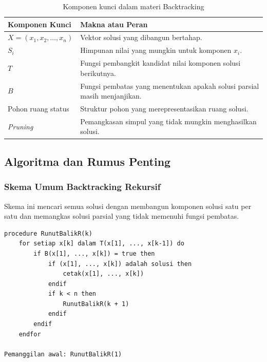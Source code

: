 \begin{table}[H]
\centering
\begin{tabularx}{\textwidth}{|L{0.28\textwidth}|X|}
\hline
\textbf{Komponen Kunci} & \textbf{Makna atau Peran} \\
\hline
$X=(x_1,x_2,\ldots,x_n)$ & Vektor solusi yang dibangun bertahap. \\
\hline
$S_i$ & Himpunan nilai yang mungkin untuk komponen $x_i$. \\
\hline
$T$ & Fungsi pembangkit kandidat nilai komponen solusi berikutnya. \\
\hline
$B$ & Fungsi pembatas yang menentukan apakah solusi parsial masih menjanjikan. \\
\hline
Pohon ruang status & Struktur pohon yang merepresentasikan ruang solusi. \\
\hline
\textit{Pruning} & Pemangkasan simpul yang tidak mungkin menghasilkan solusi. \\
\hline
\end{tabularx}
\caption{Komponen kunci dalam materi Backtracking}
\label{tab:komponen-kunci-backtracking}
\end{table}

\subsection{Algoritma dan Rumus Penting}

\subsubsection{Skema Umum Backtracking Rekursif}

\begin{jawab}
Skema ini mencari semua solusi dengan membangun komponen solusi satu per satu dan memangkas solusi parsial yang tidak memenuhi fungsi pembatas.
\end{jawab}

\begin{lstlisting}[caption={Pseudocode backtracking rekursif}, label={lst:backtracking-rekursif}]
procedure RunutBalikR(k)
    for setiap x[k] dalam T(x[1], ..., x[k-1]) do
        if B(x[1], ..., x[k]) = true then
            if (x[1], ..., x[k]) adalah solusi then
                cetak(x[1], ..., x[k])
            endif
            if k < n then
                RunutBalikR(k + 1)
            endif
        endif
    endfor

Pemanggilan awal: RunutBalikR(1)
\end{lstlisting}

